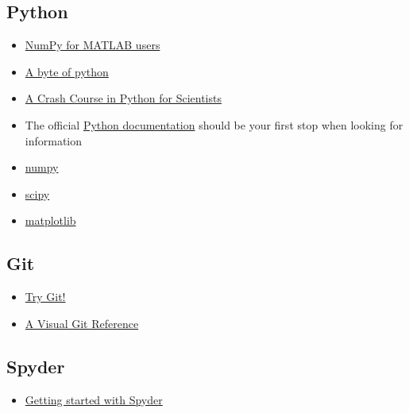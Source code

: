 \documentclass{cmc}
\begin{document}
\subsection{Python}
\label{sec:python_ref}
\begin{itemize}
\item
  \href{http://mathesaurus.sourceforge.net/matlab-numpy.html}{NumPy
    for MATLAB users}
\item \href{https://python.swaroopch.com}{A byte of python}
\item \href{http://nbviewer.jupyter.org/gist/rpmuller/5920182}{A Crash
    Course in Python for Scientists}
\item The official \href{https://docs.python.org/2/}{Python
    documentation} should be your first stop when looking for
  information
\item \href{http://numpy.scipy.org/}{numpy}
\item \href{http://www.scipy.org/}{scipy}
\item \href{http://matplotlib.sourceforge.net/}{matplotlib}
\end{itemize}

\subsection{Git}
\label{sec:git_ref}
\begin{itemize}
\item \href{https://try.github.io/levels/1/challenges/1}{Try Git!}
\item
  \href{https://marklodato.github.io/visual-git-guide/index-en.html}{A
    Visual Git Reference}
\end{itemize}

\subsection{Spyder}
\label{sec:spyder_ref}
\begin{itemize}
\item
  \href{http://www.southampton.ac.uk/~fangohr/blog/spyder-the-python-ide.html#first-steps-with-spyder}{Getting started with Spyder}
\end{itemize}
\end{document}
